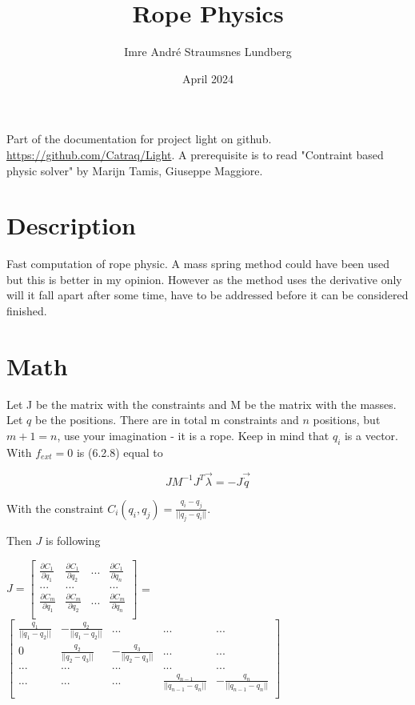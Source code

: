 \documentclass{article}
\title{Rope Physics}
\author{Imre André Straumsnes Lundberg}
\date{April 2024}
\begin{document}
\maketitle

\section*{}
Part of the documentation for project light on github.  \href{https://github.com/Catraq/Light}{https://github.com/Catraq/Light}. A prerequisite is to read "Contraint based physic solver" by Marijn Tamis, Giuseppe Maggiore. 

\newpage

\section*{Description}

Fast computation of rope physic. A mass spring method could have been used but this is better in my opinion. However as the method uses the derivative only will it fall apart after some time, have to be addressed before it can be considered finished. 

\section*{Math}


Let J be the matrix with the constraints and M be the matrix with the masses. Let $q$ be the positions. There are in total m constraints and $n$ positions, but $m+1 = n$, use your imagination - it is a rope.  Keep in mind that $q_i$ is a vector. 
With $f_{ext} = 0$ is (6.2.8) equal to 

$$ JM^{-1}J^T\vec{\lambda} = - J\vec{\dot{q}} $$

\noindent
With the constraint $C_i(q_i, q_j) = \frac{q_{i} - q_{j}}{||q_{j} - q_{i}||}$. 

\noindent
Then $J$ is following

$
J =
\begin{bmatrix}
\frac{\partial{C_1}}{\partial{q_1}} & \frac{\partial{C_1}}{\partial{q_2}} &  ... & \frac{\partial{C_1}}{\partial{q_n}} \\
... & ... & & ... \\
\frac{\partial{C_m}}{\partial{q_1}} & \frac{\partial{C_m}}{\partial{q_2}} &  ... & \frac{\partial{C_m}}{\partial{q_n}} \\

\end{bmatrix}$
=
$\begin{bmatrix}
\frac{q_1}{||q_1 - q_2||} & -\frac{q_2}{||q_1 - q_2||} & ... & ... & ... \\
0 & \frac{q_2}{||q_2 - q_3||} & -\frac{q_3}{||q_2 - q_3||} & ... & ... \\
... & ... & ... & ... & ...\\
                                    
... & ... & ... & \frac{q_{n-1}}{||q_{n-1} - q_{n}||} & -\frac{q_n}{||q_{n-1} - q_n||} \\


\end{bmatrix}$
\end{document}
